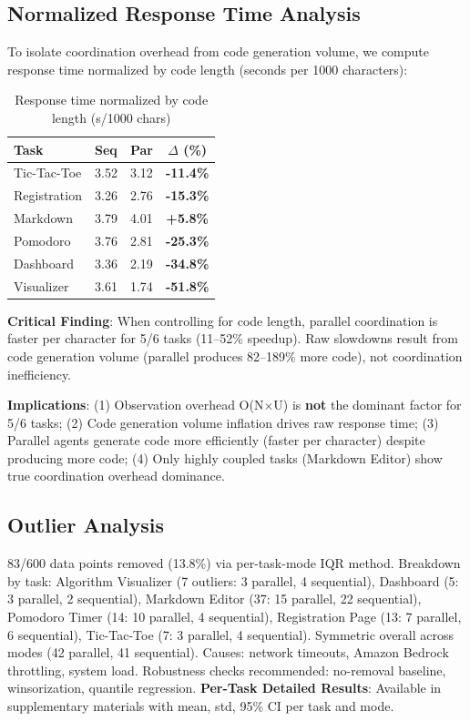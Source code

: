 \documentclass{article}
\begin{document}
\subsection{Normalized Response Time Analysis}

To isolate coordination overhead from code generation volume, we compute response time normalized by code length (seconds per 1000 characters):

\begin{table}[t]
\caption{Response time normalized by code length (s/1000 chars)}
\label{tab:normalized}
\vskip 0.15in
\centering
\small
\begin{tabular}{lccc}
\toprule
\textbf{Task} & \textbf{Seq} & \textbf{Par} & \textbf{$\Delta$ (\%)} \\
\midrule
Tic-Tac-Toe & 3.52 & 3.12 & \textbf{-11.4\%} \\
Registration & 3.26 & 2.76 & \textbf{-15.3\%} \\
Markdown & 3.79 & 4.01 & \textbf{+5.8\%} \\
Pomodoro & 3.76 & 2.81 & \textbf{-25.3\%} \\
Dashboard & 3.36 & 2.19 & \textbf{-34.8\%} \\
Visualizer & 3.61 & 1.74 & \textbf{-51.8\%} \\
\bottomrule
\end{tabular}
\end{table}

\textbf{Critical Finding}: When controlling for code length, parallel coordination is faster per character for 5/6 tasks (11--52\% speedup). Raw slowdowns result from code generation volume (parallel produces 82--189\% more code), not coordination inefficiency.

\textbf{Implications}: (1) Observation overhead O(N$\times$U) is \textbf{not} the dominant factor for 5/6 tasks; (2) Code generation volume inflation drives raw response time; (3) Parallel agents generate code more efficiently (faster per character) despite producing more code; (4) Only highly coupled tasks (Markdown Editor) show true coordination overhead dominance.

\subsection{Outlier Analysis}

83/600 data points removed (13.8\%) via per-task-mode IQR method. Breakdown by task: Algorithm Visualizer (7 outliers: 3 parallel, 4 sequential), Dashboard (5: 3 parallel, 2 sequential), Markdown Editor (37: 15 parallel, 22 sequential), Pomodoro Timer (14: 10 parallel, 4 sequential), Registration Page (13: 7 parallel, 6 sequential), Tic-Tac-Toe (7: 3 parallel, 4 sequential). Symmetric overall across modes (42 parallel, 41 sequential). Causes: network timeouts, Amazon Bedrock throttling, system load. Robustness checks recommended: no-removal baseline, winsorization, quantile regression. \textbf{Per-Task Detailed Results}: Available in supplementary materials with mean, std, 95\% CI per task and mode.
\end{document}
